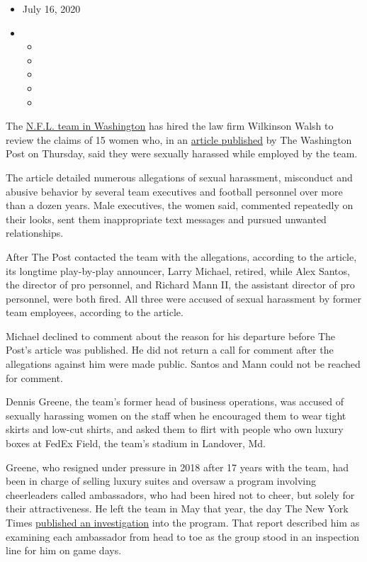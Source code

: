 \begin{itemize}
\item
  July 16, 2020
\item
  \begin{itemize}
  \item
  \item
  \item
  \item
  \item
  \end{itemize}
\end{itemize}

The
\href{https://www.nytimes3xbfgragh.onion/2020/08/10/sports/football/washington-nfl-snyder-lawsuit.html}{N.F.L.
team in Washington} has hired the law firm Wilkinson Walsh to review the
claims of 15 women who, in an
\href{https://www.washingtonpost.com/sports/2020/07/16/redskins-sexual-harassment-larry-michael-alex-santos/?arc404=true}{article
published} by The Washington Post on Thursday, said they were sexually
harassed while employed by the team.

The article detailed numerous allegations of sexual harassment,
misconduct and abusive behavior by several team executives and football
personnel over more than a dozen years. Male executives, the women said,
commented repeatedly on their looks, sent them inappropriate text
messages and pursued unwanted relationships.

After The Post contacted the team with the allegations, according to the
article, its longtime play-by-play announcer, Larry Michael, retired,
while Alex Santos, the director of pro personnel, and Richard Mann II,
the assistant director of pro personnel, were both fired. All three were
accused of sexual harassment by former team employees, according to the
article.

Michael declined to comment about the reason for his departure before
The Post's article was published. He did not return a call for comment
after the allegations against him were made public. Santos and Mann
could not be reached for comment.

Dennis Greene, the team's former head of business operations, was
accused of sexually harassing women on the staff when he encouraged them
to wear tight skirts and low-cut shirts, and asked them to flirt with
people who own luxury boxes at FedEx Field, the team's stadium in
Landover, Md.

Greene, who resigned under pressure in 2018 after 17 years with the
team, had been in charge of selling luxury suites and oversaw a program
involving cheerleaders called ambassadors, who had been hired not to
cheer, but solely for their attractiveness. He left the team in May that
year, the day The New York Times
\href{https://www.nytimes3xbfgragh.onion/2018/05/31/sports/nfl-cheerleaders.html}{published
an investigation} into the program. That report described him as
examining each ambassador from head to toe as the group stood in an
inspection line for him on game days.

